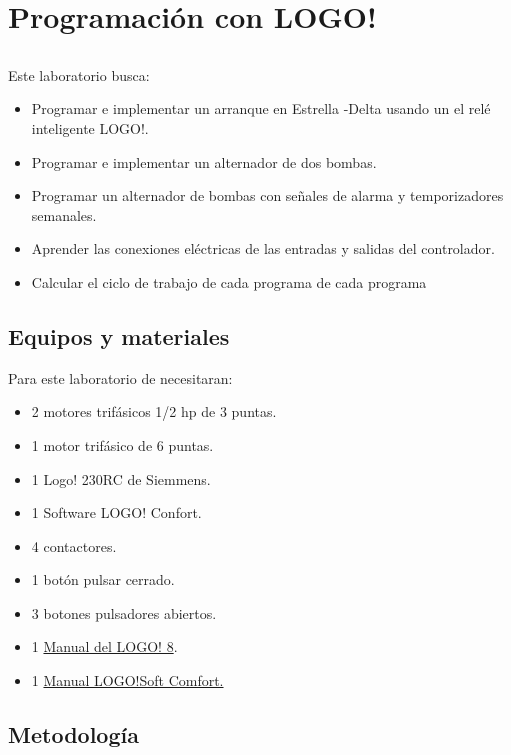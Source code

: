 \chapter{Programación con LOGO!}
	  
\section{\obj}
Este  laboratorio busca:
\begin{itemize}
    \item Programar e implementar un arranque en Estrella -Delta usando un el relé inteligente LOGO!.
    \item Programar e implementar un alternador de dos bombas.
    \item Programar un alternador de bombas con señales de alarma y temporizadores semanales.
    \item Aprender las conexiones eléctricas de las entradas y salidas del controlador.
    \item Calcular el ciclo de trabajo de cada programa de cada programa 
\end{itemize} 

 
\section{Equipos y materiales}
Para este laboratorio de necesitaran:
\begin{itemize}
	\item 2 motores trifásicos 1/2 hp de 3 puntas.
	\item 1 motor trifásico de 6 puntas.
	\item 1 Logo! 230RC de Siemmens.
	\item 1 Software LOGO! Confort.
	\item 4 contactores.
	\item 1 botón pulsar cerrado.
	\item 3 botones pulsadores abiertos.
	\item 1 \href{https://cache.industry.siemens.com/dl/files/041/109741041/att_924629/v1/logo_system_manual_es-ES_es-ES.pdf}{Manual del LOGO! 8}.
	\item 1 \href{https://cache.industry.siemens.com/dl/files/807/100782807/att_924633/v1/Help_es-ES_es-ES.pdf}{Manual LOGO!Soft Comfort.}
\end{itemize}

\section{Metodología}

